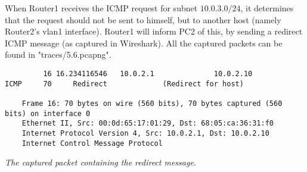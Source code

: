When Router1 receives the ICMP request for subnet $10.0.3.0/24$, it determines that the request should not be sent to himself, but to another host (namely Router2's vlan1 interface). Router1 will inform PC2 of this, by sending a redirect ICMP message (as captured in Wireshark). All the captured packets can be found in "traces/5.6.pcapng".


\begin{verbatim}
	     16 16.234116546   10.0.2.1              10.0.2.10             ICMP     70     Redirect             (Redirect for host)

	Frame 16: 70 bytes on wire (560 bits), 70 bytes captured (560 bits) on interface 0
	Ethernet II, Src: 00:0d:65:17:01:29, Dst: 68:05:ca:36:31:f0
	Internet Protocol Version 4, Src: 10.0.2.1, Dst: 10.0.2.10
	Internet Control Message Protocol
\end{verbatim}

\textit{The captured packet containing the redirect message.}